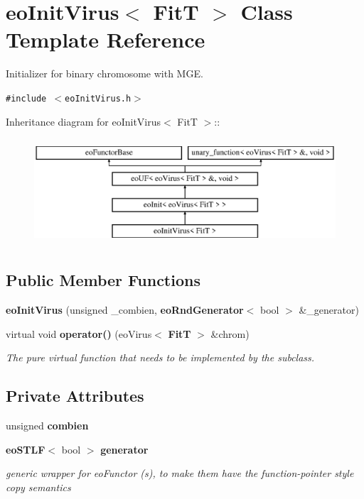 \section{eo\-Init\-Virus$<$ Fit\-T $>$ Class Template Reference}
\label{classeo_init_virus}
Initializer for binary chromosome with MGE.  


{\tt \#include $<$eo\-Init\-Virus.h$>$}

Inheritance diagram for eo\-Init\-Virus$<$ Fit\-T $>$::\begin{figure}[H]
\begin{center}
\leavevmode
\includegraphics[height=4cm]{classeo_init_virus}
\end{center}
\end{figure}
\subsection*{Public Member Functions}
\begin{CompactItemize}
\item 
{\bf eo\-Init\-Virus} (unsigned \_\-combien, {\bf eo\-Rnd\-Generator}$<$ bool $>$ \&\_\-generator)\label{classeo_init_virus_a0}

\item 
virtual void {\bf operator()} (eo\-Virus$<$ {\bf Fit\-T} $>$ \&chrom)\label{classeo_init_virus_a1}

\begin{CompactList}\small\item\em The pure virtual function that needs to be implemented by the subclass. \item\end{CompactList}\end{CompactItemize}
\subsection*{Private Attributes}
\begin{CompactItemize}
\item 
unsigned {\bf combien}\label{classeo_init_virus_r0}

\item 
{\bf eo\-STLF}$<$ bool $>$ {\bf generator}\label{classeo_init_virus_r1}

\begin{CompactList}\small\item\em generic wrapper for eo\-Functor (s), to make them have the function-pointer style copy semantics \item\end{CompactList}\end{CompactItemize}


